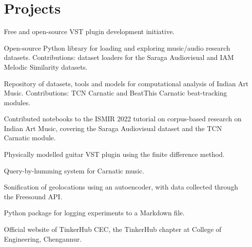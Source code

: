 \section{Projects}
Free and open-source VST plugin development initiative.\\
\sectionsep

Open-source Python library for loading and exploring music/audio research datasets. Contributions: dataset loaders for the Saraga Audiovisual and IAM Melodic Similarity datasets.\\
\sectionsep

Repository of datasets, tools and models for computational analysis of Indian Art Music. Contributions: TCN Carnatic and BeatThis Carnatic beat-tracking modules.\\
\sectionsep

Contributed notebooks to the ISMIR 2022 tutorial on corpus-based research on Indian Art Music, covering the Saraga Audiovisual dataset and the TCN Carnatic module.\\
\sectionsep

Physically modelled guitar VST plugin using the finite difference method.\\
\sectionsep

Query-by-humming system for Carnatic music.\\
\sectionsep

Sonification of geolocations using an autoencoder, with data collected through the Freesound API.\\
\sectionsep

Python package for logging experiments to a Markdown file.\\
\sectionsep

Official website of TinkerHub CEC, the TinkerHub chapter at College of Engineering, Chengannur.
\sectionsep
